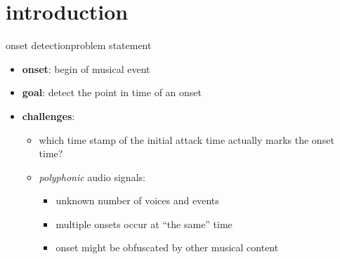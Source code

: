     \section[intro]{introduction}
        \begin{frame}{onset detection}{problem statement}
            \begin{itemize}
                \item \textbf{onset}: begin of musical event

                \bigskip
                \item \textbf{goal}: detect the point in time of an onset

                \bigskip
                \item   \textbf{challenges}:
                    \begin{itemize}
                        \item   which time stamp of the initial attack time actually marks the onset time?
                        \smallskip
                        \item   \textit{polyphonic} audio signals:
                            \begin{itemize}
                                \item   unknown number of voices and events
                                \item   multiple onsets occur at ``the same'' time
                                \item   onset might be obfuscated by other musical content
                            \end{itemize}
                    \end{itemize}
            \end{itemize}
        \end{frame}
